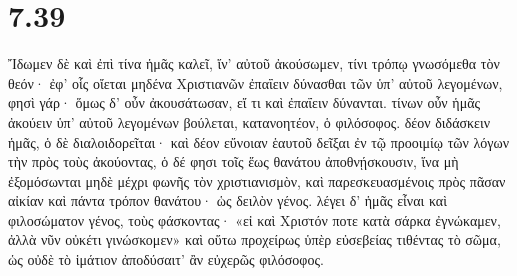 \section*{7.39}

Ἴδωμεν δὲ καὶ ἐπὶ τίνα ἡμᾶς καλεῖ, ἵν' αὐτοῦ ἀκούσωμεν, τίνι τρόπῳ γνωσόμεθα τὸν θεόν· ἐφ' οἷς οἴεται μηδένα Χριστιανῶν ἐπαΐειν δύνασθαι τῶν ὑπ' αὐτοῦ λεγομένων, φησὶ γάρ· ὅμως δ' οὖν ἀκουσάτωσαν, εἴ τι καὶ ἐπαΐειν δύνανται. τίνων οὖν ἡμᾶς ἀκούειν ὑπ' αὐτοῦ λεγομένων βούλεται, κατανοητέον, ὁ φιλόσοφος. δέον διδάσκειν ἡμᾶς, ὁ δὲ διαλοιδορεῖται· καὶ δέον εὔνοιαν ἑαυτοῦ δεῖξαι ἐν τῷ προοιμίῳ τῶν λόγων τὴν πρὸς τοὺς ἀκούοντας, ὁ δέ φησι τοῖς ἕως θανάτου ἀποθνῄσκουσιν, ἵνα μὴ ἐξομόσωνται μηδὲ μέχρι φωνῆς τὸν χριστιανισμὸν, καὶ παρεσκευασμένοις πρὸς πᾶσαν αἰκίαν καὶ πάντα τρόπον θανάτου· ὡς δειλὸν γένος. λέγει δ' ἡμᾶς εἶναι καὶ φιλοσώματον γένος, τοὺς φάσκοντας· «εἰ καὶ Χριστόν ποτε κατὰ σάρκα ἐγνώκαμεν, ἀλλὰ νῦν οὐκέτι γινώσκομεν» καὶ οὕτω προχείρως ὑπὲρ εὐσεβείας τιθέντας τὸ σῶμα, ὡς οὐδὲ τὸ ἱμάτιον ἀποδύσαιτ' ἂν εὐχερῶς φιλόσοφος.